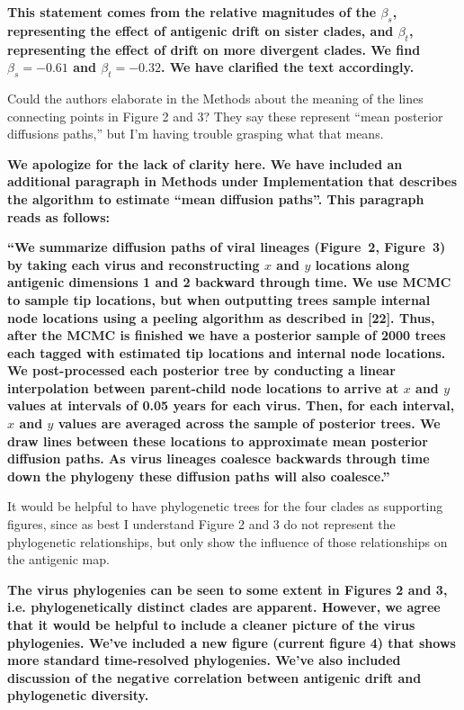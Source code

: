 \documentclass[11pt,oneside,letterpaper]{article}
\begin{document}
\textbf{This statement comes from the relative magnitudes of the $\beta_s$, representing the effect of antigenic drift on sister clades, and $\beta_t$, representing the effect of drift on more divergent clades.  We find $\beta_s = -0.61$ and $\beta_t = -0.32$.  We have clarified the text accordingly.}

Could the authors elaborate in the Methods about the meaning of the lines connecting points in Figure 2 and 3? They say these represent ``mean posterior diffusions paths,'' but I'm having trouble grasping what that means.

\textbf{We apologize for the lack of clarity here.  We have included an additional paragraph in Methods under Implementation that describes the algorithm to estimate ``mean diffusion paths''.  This paragraph reads as follows:}

\textbf{``We summarize diffusion paths of viral lineages (Figure~2, Figure~3) by taking each virus and reconstructing $x$ and $y$ locations along antigenic dimensions 1 and 2 backward through time.
We use MCMC to sample tip locations, but when outputting trees sample internal node locations using a peeling algorithm as described in [22].
Thus, after the MCMC is finished we have a posterior sample of 2000 trees each tagged with estimated tip locations and internal node locations.
We post-processed each posterior tree by conducting a linear interpolation between parent-child node locations to arrive at $x$ and $y$ values at intervals of 0.05 years for each virus.
Then, for each interval, $x$ and $y$ values are averaged across the sample of posterior trees.
We draw lines between these locations to approximate mean posterior diffusion paths.
As virus lineages coalesce backwards through time down the phylogeny these diffusion paths will also coalesce.''}

It would be helpful to have phylogenetic trees for the four clades as supporting figures, since as best I understand Figure 2 and 3 do not represent the phylogenetic relationships, but only show the influence of those relationships on the antigenic map. 

\textbf{The virus phylogenies can be seen to some extent in Figures 2 and 3, i.e. phylogenetically distinct clades are apparent.  However, we agree that it would be helpful to include a cleaner picture of the virus phylogenies.  We've included a new figure (current figure 4) that shows more standard time-resolved phylogenies.  We've also included discussion of the negative correlation between antigenic drift and phylogenetic diversity.}
\end{document}
